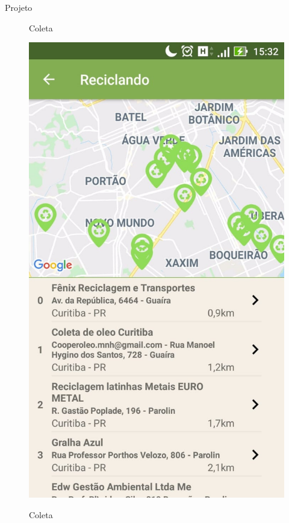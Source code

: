 \documentclass[
	12pt,				%
	openright,			%
	twoside,			%
	a4paper,			%
	english,			%
	french,				%
	spanish,			%
	brazil				%
	]{abntex2}
\begin{document}
\begin{chapter}{Projeto}
    \begin{figure}[htb]    
 \centering
  \begin{minipage}{0.45\textwidth}
    \centering
    \caption{Coleta}
    \includegraphics[scale=0.35]{media/tela_location_1.jpg}
     \label{fig:tela_location_1}
  \end{minipage}
  \hfill
  \begin{minipage}{0.45\textwidth}
    \centering
    \caption{Coleta}

\end{minipage}
\end{figure}
\end{chapter}
\end{document}
